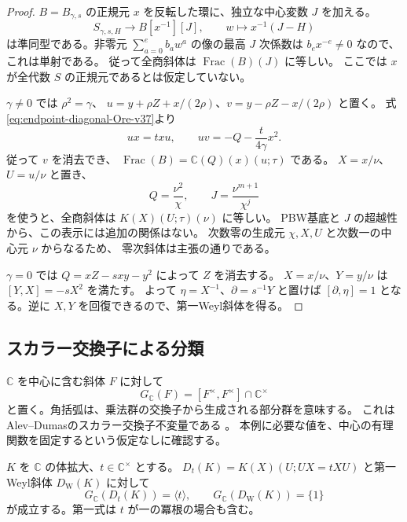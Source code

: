 \begin{proof}
$B=B_{\gamma,s}$ の正規元 $x$ を反転した環に、独立な中心変数 $J$ を加える。
\[
 S_{\gamma,s,H}\longrightarrow B[x^{-1}][J],\qquad
 w\longmapsto x^{-1}(J-H)
\]
は準同型である。非零元 $\sum_{a=0}^e b_aw^a$ の像の最高 $J$ 次係数は
$b_ex^{-e}\ne0$ なので、これは単射である。
従って全商斜体は $\operatorname{Frac}(B)(J)$ に等しい。
ここでは $x$ が全代数 $S$ の正規元であるとは仮定していない。

$\gamma\ne0$ では $\rho^2=\gamma$、
$u=y+\rho Z+x/(2\rho)$、$v=y-\rho Z-x/(2\rho)$ と置く。
式\eqref{eq:endpoint-diagonal-Ore-v37}より
\[
 ux=txu,\qquad uv=-Q-\frac{t}{4\gamma}x^2.
\]
従って $v$ を消去でき、
$\operatorname{Frac}(B)=\mathbb C(Q)(x)(u;\tau)$ である。
$X=x/\nu$、$U=u/\nu$ と置き、
\[
 Q=\frac{\nu^2}{\chi},\qquad J=\frac{\nu^{m+1}}{\chi^j}
\]
を使うと、全商斜体は $K(X)(U;\tau)(\nu)$ に等しい。
PBW基底と $J$ の超越性から、この表示には追加の関係はない。
次数零の生成元 $\chi,X,U$ と次数一の中心元 $\nu$ からなるため、
零次斜体は主張の通りである。

$\gamma=0$ では $Q=xZ-sxy-y^2$ によって $Z$ を消去する。
$X=x/\nu$、$Y=y/\nu$ は $[Y,X]=-sX^2$ を満たす。
よって $\eta=X^{-1}$、$\partial=s^{-1}Y$ と置けば
$[\partial,\eta]=1$ となる。逆に $X,Y$ を回復できるので、第一Weyl斜体を得る。
\end{proof}

\subsection{スカラー交換子による分類}

$\mathbb C$ を中心に含む斜体 $F$ に対して
\[
 G_{\mathbb C}(F)=[F^\times,F^\times]\cap\mathbb C^\times
\]
と置く。角括弧は、乗法群の交換子から生成される部分群を意味する。
これはAlev--Dumasのスカラー交換子不変量である
\cite{AlevDumas1994Bir38,RichardSolotar2006Bir38}。
本例に必要な値を、中心の有理関数を固定するという仮定なしに確認する。

\begin{lemma}[二種類の関数斜体の不変量]
\label{lem:endpoint-AD-v38}
$K$ を $\mathbb C$ の体拡大、$t\in\mathbb C^\times$ とする。
$D_t(K)=K(X)(U;UX=tXU)$ と第一Weyl斜体 $D_{
\mathrm W}(K)$ に対して
\[
 G_{\mathbb C}(D_t(K))=\langle t\rangle,\qquad
 G_{\mathbb C}(D_{\mathrm W}(K))=\{1\}
\]
が成立する。第一式は $t$ が一の冪根の場合も含む。
\end{lemma}

